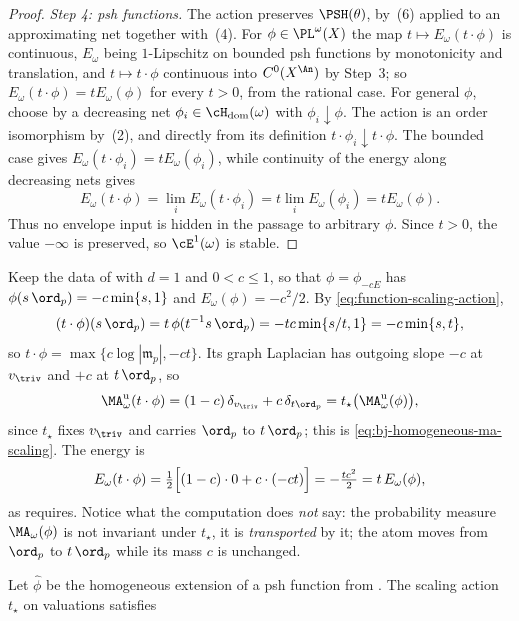 \begin{proof}
\emph{Step 4: psh functions.}  The action preserves $\PSH(\theta)$, by
\,(6) applied to an approximating net together
with \,(4).  For $\phi\in\PL^{\omega}(X)$ the
map $t\mapsto E_\omega(t\cdot\phi)$ is continuous, $E_\omega$ being
$1$-Lipschitz on bounded psh functions by monotonicity and translation,
and $t\mapsto t\cdot\phi$ continuous
into $C^0(X^{\An})$ by Step~3; so
$E_\omega(t\cdot\phi)=tE_\omega(\phi)$ for every $t>0$, from the
rational case.  For general $\phi$, choose by
 a decreasing net
$\phi_i\in\cH_{\mathrm{dom}}(\omega)$ with $\phi_i\downarrow\phi$.
The action is an order isomorphism by
\,(2), and directly from its definition
$t\cdot\phi_i\downarrow t\cdot\phi$.  The bounded case gives
$E_\omega(t\cdot\phi_i)=tE_\omega(\phi_i)$, while continuity of the
energy along decreasing nets gives
\[
 E_\omega(t\cdot\phi)
 =\lim_iE_\omega(t\cdot\phi_i)
 =t\lim_iE_\omega(\phi_i)
 =tE_\omega(\phi).
\]
Thus no envelope input is hidden in the passage to arbitrary $\phi$.
Since $t>0$, the value $-\infty$ is preserved, so
$\cE^1(\omega)$ is stable.
\end{proof}

\begin{example}
\label{ex:ch46-homogeneity-p1}
Keep the data of  with $d=1$ and $0<c\le1$, so that
$\phi=\phi_{-cE}$ has $\phi(s\,\ord_p)=-c\min\{s,1\}$ and
$E_\omega(\phi)=-c^2/2$.  By \eqref{eq:function-scaling-action},
\[
 (t\cdot\phi)(s\,\ord_p)=t\,\phi(t^{-1}s\,\ord_p)
 =-tc\min\{s/t,1\}=-c\min\{s,t\},
\]
so $t\cdot\phi=\max\{c\log|\mathfrak m_p|,-ct\}$.  Its graph Laplacian
has outgoing slope $-c$ at $v_{\triv}$ and $+c$ at $t\,\ord_p$, so
\[
 \MA^{\mathrm u}_\omega(t\cdot\phi)
 =(1-c)\,\delta_{v_{\triv}}+c\,\delta_{t\ord_p}
 =t_\star\bigl(\MA^{\mathrm u}_\omega(\phi)\bigr),
\]
since $t_\star$ fixes $v_{\triv}$ and carries $\ord_p$ to
$t\,\ord_p$; this is \eqref{eq:bj-homogeneous-ma-scaling}.  The energy is
\[
 E_\omega(t\cdot\phi)
 =\tfrac12\Bigl[(1-c)\cdot0+c\cdot(-ct)\Bigr]
 =-\tfrac{tc^2}{2}=t\,E_\omega(\phi),
\]
as  requires.  Notice what the
computation does \emph{not} say: the probability measure
$\MA_\omega(\phi)$ is not invariant under $t_\star$, it is
\emph{transported} by it; the atom moves from $\ord_p$ to $t\,\ord_p$
while its mass $c$ is unchanged.
\end{example}

Let $\widehat\phi$ be the homogeneous extension of a psh function from
.  The scaling action $t_\star$ on
valuations satisfies

